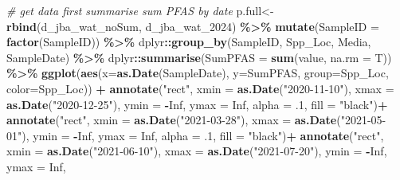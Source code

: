 \documentclass[
]{article}
\newenvironment{Shaded}{\begin{snugshade}}{\end{snugshade}}
\newcommand{\AttributeTok}[1]{\textcolor[rgb]{0.13,0.29,0.53}{#1}}
\newcommand{\CommentTok}[1]{\textcolor[rgb]{0.56,0.35,0.01}{\textit{#1}}}
\newcommand{\ConstantTok}[1]{\textcolor[rgb]{0.56,0.35,0.01}{#1}}
\newcommand{\DecValTok}[1]{\textcolor[rgb]{0.00,0.00,0.81}{#1}}
\newcommand{\FunctionTok}[1]{\textcolor[rgb]{0.13,0.29,0.53}{\textbf{#1}}}
\newcommand{\NormalTok}[1]{#1}
\newcommand{\OtherTok}[1]{\textcolor[rgb]{0.56,0.35,0.01}{#1}}
\newcommand{\SpecialCharTok}[1]{\textcolor[rgb]{0.81,0.36,0.00}{\textbf{#1}}}
\newcommand{\StringTok}[1]{\textcolor[rgb]{0.31,0.60,0.02}{#1}}
\begin{document}
\begin{Shaded}
\begin{Highlighting}[]
\CommentTok{\# get data first summarise sum PFAS by date}
\NormalTok{p.full}\OtherTok{\textless{}{-}}
  \FunctionTok{rbind}\NormalTok{(d\_jba\_wat\_noSum, d\_jba\_wat\_2024) }\SpecialCharTok{\%\textgreater{}\%} 
  \FunctionTok{mutate}\NormalTok{(}\AttributeTok{SampleID =} \FunctionTok{factor}\NormalTok{(SampleID)) }\SpecialCharTok{\%\textgreater{}\%} 
\NormalTok{  dplyr}\SpecialCharTok{::}\FunctionTok{group\_by}\NormalTok{(SampleID, Spp\_Loc, Media, SampleDate) }\SpecialCharTok{\%\textgreater{}\%} 
\NormalTok{  dplyr}\SpecialCharTok{::}\FunctionTok{summarise}\NormalTok{(}\AttributeTok{SumPFAS =} \FunctionTok{sum}\NormalTok{(value, }\AttributeTok{na.rm =}\NormalTok{ T)) }\SpecialCharTok{\%\textgreater{}\%} 
  \FunctionTok{ggplot}\NormalTok{(}\FunctionTok{aes}\NormalTok{(}\AttributeTok{x=}\FunctionTok{as.Date}\NormalTok{(SampleDate), }\AttributeTok{y=}\NormalTok{SumPFAS, }\AttributeTok{group=}\NormalTok{Spp\_Loc, }\AttributeTok{color=}\NormalTok{Spp\_Loc)) }\SpecialCharTok{+}
    \FunctionTok{annotate}\NormalTok{(}\StringTok{"rect"}\NormalTok{, }\AttributeTok{xmin =} \FunctionTok{as.Date}\NormalTok{(}\StringTok{"2020{-}11{-}10"}\NormalTok{), }\AttributeTok{xmax =} \FunctionTok{as.Date}\NormalTok{(}\StringTok{"2020{-}12{-}25"}\NormalTok{),}
             \AttributeTok{ymin =} \SpecialCharTok{{-}}\ConstantTok{Inf}\NormalTok{, }\AttributeTok{ymax =} \ConstantTok{Inf}\NormalTok{,}
             \AttributeTok{alpha =}\NormalTok{ .}\DecValTok{1}\NormalTok{, }\AttributeTok{fill =} \StringTok{"black"}\NormalTok{)}\SpecialCharTok{+}
    \FunctionTok{annotate}\NormalTok{(}\StringTok{"rect"}\NormalTok{, }\AttributeTok{xmin =} \FunctionTok{as.Date}\NormalTok{(}\StringTok{"2021{-}03{-}28"}\NormalTok{), }\AttributeTok{xmax =} \FunctionTok{as.Date}\NormalTok{(}\StringTok{"2021{-}05{-}01"}\NormalTok{),}
             \AttributeTok{ymin =} \SpecialCharTok{{-}}\ConstantTok{Inf}\NormalTok{, }\AttributeTok{ymax =} \ConstantTok{Inf}\NormalTok{,}
             \AttributeTok{alpha =}\NormalTok{ .}\DecValTok{1}\NormalTok{, }\AttributeTok{fill =} \StringTok{"black"}\NormalTok{)}\SpecialCharTok{+}
    \FunctionTok{annotate}\NormalTok{(}\StringTok{"rect"}\NormalTok{, }\AttributeTok{xmin =} \FunctionTok{as.Date}\NormalTok{(}\StringTok{"2021{-}06{-}10"}\NormalTok{), }\AttributeTok{xmax =} \FunctionTok{as.Date}\NormalTok{(}\StringTok{"2021{-}07{-}20"}\NormalTok{),}
             \AttributeTok{ymin =} \SpecialCharTok{{-}}\ConstantTok{Inf}\NormalTok{, }\AttributeTok{ymax =} \ConstantTok{Inf}\NormalTok{,}

\end{Highlighting}
\end{Shaded}
\end{document}
